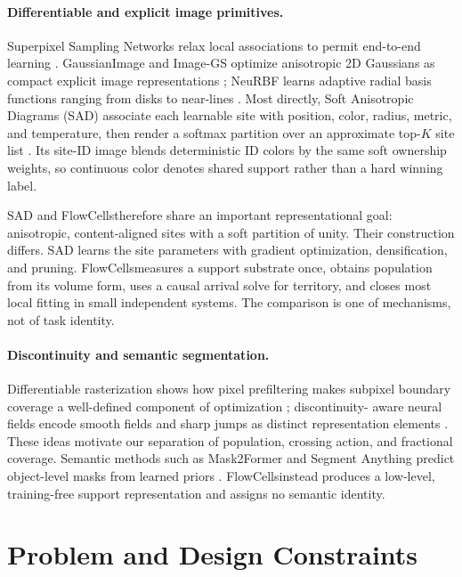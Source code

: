 \documentclass[11pt,letterpaper]{article}
\newcommand{\method}{FlowCells}
\begin{document}
\paragraph{Differentiable and explicit image primitives.}
Superpixel Sampling Networks relax local associations to permit end-to-end learning
\citep{jampani2018ssn}. GaussianImage and Image-GS optimize anisotropic 2D Gaussians as
compact explicit image representations
\citep{zhang2024gaussianimage,zhang2025imagegs}; NeuRBF learns adaptive radial basis
functions ranging from disks to near-lines \citep{chen2023neurbf}. Most directly, Soft
Anisotropic Diagrams (SAD) associate each learnable site with position, color, radius,
metric, and temperature, then render a softmax partition over an approximate top-\(K\)
site list \citep{iinbor2026sad}. Its site-ID image blends deterministic ID colors by the
same soft ownership weights, so continuous color denotes shared support rather than a
hard winning label.

SAD and \method therefore share an important representational goal: anisotropic,
content-aligned sites with a soft partition of unity. Their construction differs.
SAD learns the site parameters with gradient optimization, densification, and pruning.
\method measures a support substrate once, obtains population from its volume form,
uses a causal arrival solve for territory, and closes most local fitting in small
independent systems. The comparison is one of mechanisms, not of task identity.

\paragraph{Discontinuity and semantic segmentation.}
Differentiable rasterization shows how pixel prefiltering makes subpixel boundary
coverage a well-defined component of optimization \citep{li2020diffvg}; discontinuity-
aware neural fields encode smooth fields and sharp jumps as distinct representation
elements \citep{belhe2023danf}. These ideas motivate our separation of population,
crossing action, and fractional coverage. Semantic methods such as Mask2Former and
Segment Anything predict object-level masks from learned priors
\citep{cheng2022mask2former,kirillov2023sam}. \method instead produces a low-level,
training-free support representation and assigns no semantic identity.

\section{Problem and Design Constraints}
\label{sec:problem}
\end{document}
